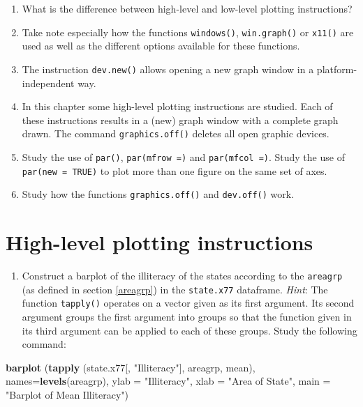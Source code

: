 \documentclass[
]{book}
\newenvironment{Shaded}{\begin{snugshade}}{\end{snugshade}}
\newcommand{\AttributeTok}[1]{\textcolor[rgb]{0.13,0.29,0.53}{#1}}
\newcommand{\FunctionTok}[1]{\textcolor[rgb]{0.13,0.29,0.53}{\textbf{#1}}}
\newcommand{\NormalTok}[1]{#1}
\newcommand{\StringTok}[1]{\textcolor[rgb]{0.31,0.60,0.02}{#1}}
\providecommand{\tightlist}{%
  \setlength{\itemsep}{0pt}\setlength{\parskip}{0pt}}
\begin{document}
\begin{enumerate}
\def\labelenumi{(\alph{enumi})}
\item
  What is the difference between high-level and low-level plotting instructions?
\item
  Take note especially how the functions \texttt{windows()}, \texttt{win.graph()} or \texttt{x11()} are used as well as the different options available for these functions.
\item
  The instruction \texttt{dev.new()} allows opening a new graph window in a platform-independent way.
\item
  In this chapter some high-level plotting instructions are studied. Each of these instructions results in a (new) graph window with a complete graph drawn. The command \texttt{graphics.off()} deletes all open graphic devices.
\item
  Study the use of \texttt{par()}, \texttt{par(mfrow\ =)} and \texttt{par(mfcol\ =)}. Study the use of \texttt{par(new\ =\ TRUE)} to plot more than one figure on the same set of axes.
\item
  Study how the functions \texttt{graphics.off()} and \texttt{dev.off()} work.
\end{enumerate}

\section{High-level plotting instructions}\label{highLevelPlotting}

\begin{enumerate}
\def\labelenumi{(\alph{enumi})}
\tightlist
\item
  Construct a barplot of the illiteracy of the states according to the \texttt{areagrp} (as defined in section \ref{areagrp}) in the \texttt{state.x77} dataframe. \emph{Hint}: The function \texttt{tapply()} operates on a vector given as its first argument. Its second argument groups the first argument into groups so that the function given in its third argument can be applied to each of these groups. Study the following command:
\end{enumerate}

\begin{Shaded}
\begin{Highlighting}[]
\FunctionTok{barplot}\NormalTok{ (}\FunctionTok{tapply}\NormalTok{ (state.x77[, }\StringTok{"Illiteracy"}\NormalTok{], areagrp, mean), }
         \AttributeTok{names=}\FunctionTok{levels}\NormalTok{(areagrp), }\AttributeTok{ylab =} \StringTok{"Illiteracy"}\NormalTok{, }\AttributeTok{xlab =} \StringTok{"Area of State"}\NormalTok{, }
         \AttributeTok{main =} \StringTok{"Barplot of Mean Illiteracy"}\NormalTok{)}
\end{Highlighting}
\end{Shaded}
\end{document}

